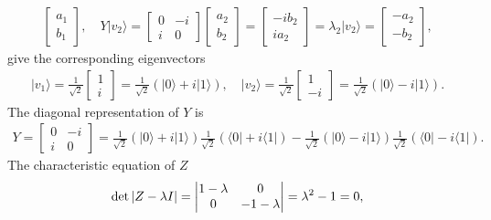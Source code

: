 \documentclass[en]{sol-man}
\begin{document}
\begin{sol}
\begin{align}
\begin{bmatrix}
            a_1\\
            b_1
        \end{bmatrix},\quad Y\lvert v_2\rangle=\begin{bmatrix}
            0&-i\\
            i&0
        \end{bmatrix}\begin{bmatrix}
            a_2\\
            b_2
        \end{bmatrix}=\begin{bmatrix}
            -ib_2\\
            ia_2
        \end{bmatrix}=\lambda_2\lvert v_2\rangle=\begin{bmatrix}
            -a_2\\
            -b_2
        \end{bmatrix},
    \end{align}
    give the corresponding eigenvectors
    \begin{align}
        \lvert v_1\rangle=\frac{1}{\sqrt{2}}\begin{bmatrix}
            1\\
            i
        \end{bmatrix}=\frac{1}{\sqrt{2}}(\lvert 0\rangle+i\lvert 1\rangle),\quad\lvert v_2\rangle=\frac{1}{\sqrt{2}}\begin{bmatrix}
            1\\
            -i
        \end{bmatrix}=\frac{1}{\sqrt{2}}(\lvert 0\rangle-i\lvert 1\rangle).
    \end{align}
    The diagonal representation of $Y$ is
    \begin{align}
        Y=\begin{bmatrix}
            0&-i\\
            i&0
        \end{bmatrix}=\frac{1}{\sqrt{2}}(\lvert 0\rangle+i\lvert 1\rangle)\frac{1}{\sqrt{2}}(\langle 0\rvert+i\langle 1\rvert)-\frac{1}{\sqrt{2}}(\lvert 0\rangle-i\lvert 1\rangle)\frac{1}{\sqrt{2}}(\langle 0\rvert-i\langle 1\rvert).
    \end{align}
    The characteristic equation of $Z$
    \begin{align}
        \det\abs{Z-\lambda I}=\abs{\begin{matrix}
            1-\lambda&0\\
            0&-1-\lambda
        \end{matrix}}=\lambda^2-1=0,

\end{align}
\end{sol}
\end{document}
